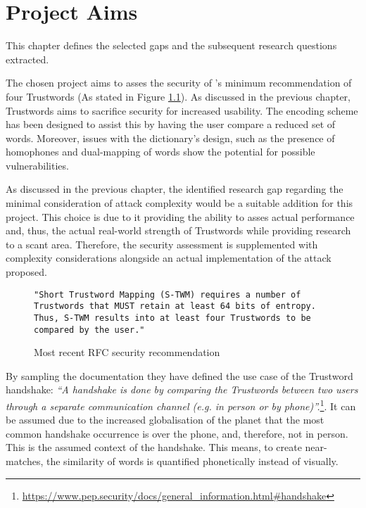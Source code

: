 \chapter{Project Aims}

This chapter defines the selected gaps and the subsequent research questions extracted.

The chosen project aims to asses the security of \pep's minimum recommendation of four Trustwords (As stated in Figure \ref{fig:trustwordsNum}). As discussed in the previous chapter, Trustwords aims to sacrifice security for increased usability. The encoding scheme has been designed to assist this by having  the user compare a reduced set of words. Moreover, issues with the dictionary's design, such as the presence of homophones and dual-mapping of words show the potential for possible vulnerabilities. 

As discussed in the previous chapter, the identified research gap regarding the minimal consideration of attack complexity would be a suitable addition for this project. This choice is due to it providing the ability to asses actual performance and, thus, the actual real-world strength of Trustwords while providing research to a scant area. Therefore, the security assessment is supplemented with complexity considerations alongside an actual implementation of the attack proposed.

\begin{center}
\begin{figure}[h!]
    \centering
        
    \begin{lstlisting}[frame=single, numbers=none]
"Short Trustword Mapping (S-TWM) requires a number of 
Trustwords that MUST retain at least 64 bits of entropy. 
Thus, S-TWM results into at least four Trustwords to be 
compared by the user."
    \end{lstlisting}

    \caption{Most recent RFC security recommendation}
    \label{fig:trustwordsNum}
\end{figure}
\end{center}
By sampling the \pep documentation they have defined the use case of the Trustword handshake: \textit{``A handshake is done by comparing the Trustwords between two users through a separate communication channel (e.g. in person or by phone)''.}\footnote{\url{https://www.pep.security/docs/general\_information.html\#handshake}}. It can be assumed due to the increased globalisation of the planet that the most common handshake occurrence is over the phone, and, therefore, not in person. This is the assumed context of the handshake. This means, to create near-matches, the similarity of words is quantified phonetically instead of visually.

